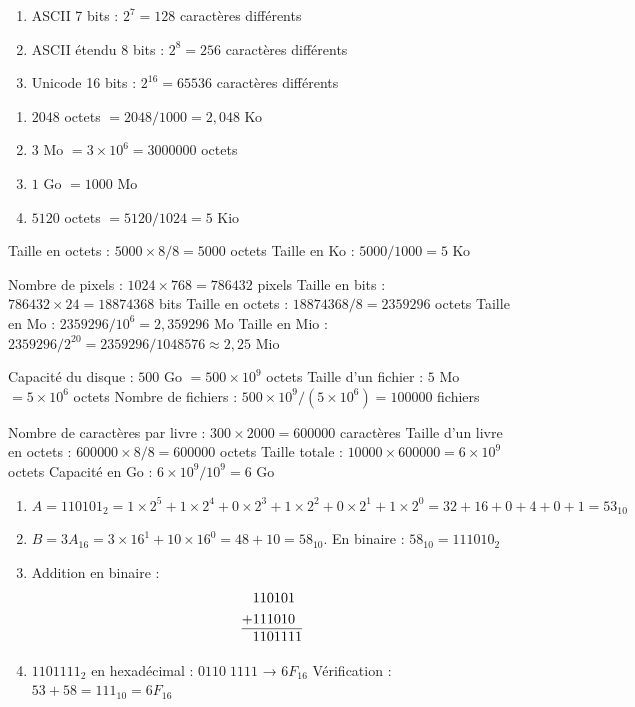 \begin{enumerate}
    \item ASCII 7 bits : $2^7 = 128$ caractères différents
    \item ASCII étendu 8 bits : $2^8 = 256$ caractères différents
    \item Unicode 16 bits : $2^{16} = 65536$ caractères différents
\end{enumerate}

\begin{enumerate}
    \item $2048$ octets $= 2048 / 1000 = 2,048$ Ko
    \item $3$ Mo $= 3 \times 10^6 = 3 000 000$ octets
    \item $1$ Go $= 1000$ Mo
    \item $5120$ octets $= 5120 / 1024 = 5$ Kio
\end{enumerate}

Taille en octets : $5000 \times 8 / 8 = 5000$ octets
Taille en Ko : $5000 / 1000 = 5$ Ko

Nombre de pixels : $1024 \times 768 = 786432$ pixels
Taille en bits : $786432 \times 24 = 18874368$ bits
Taille en octets : $18874368 / 8 = 2359296$ octets
Taille en Mo : $2359296 / 10^6 = 2,359296$ Mo
Taille en Mio : $2359296 / 2^{20} = 2359296 / 1048576 \approx 2,25$ Mio

Capacité du disque : $500$ Go $= 500 \times 10^9$ octets
Taille d'un fichier : $5$ Mo $= 5 \times 10^6$ octets
Nombre de fichiers : $500 \times 10^9 / (5 \times 10^6) = 100 000$ fichiers

Nombre de caractères par livre : $300 \times 2000 = 600 000$ caractères
Taille d'un livre en octets : $600 000 \times 8 / 8 = 600 000$ octets
Taille totale : $10 000 \times 600 000 = 6 \times 10^9$ octets
Capacité en Go : $6 \times 10^9 / 10^9 = 6$ Go

\begin{enumerate}
    \item $A = 110101_2 = 1\times2^5 + 1\times2^4 + 0\times2^3 + 1\times2^2 + 0\times2^1 + 1\times2^0 = 32 + 16 + 0 + 4 + 0 + 1 = 53_{10}$
    \item $B = 3A_{16} = 3\times16^1 + 10\times16^0 = 48 + 10 = 58_{10}$. En binaire : $58_{10} = 111010_2$
    \item Addition en binaire :
    \begin{align*}
        &110101\\
        +&111010\\
        \hline
        &1101111
    \end{align*}
    \item $1101111_2$ en hexadécimal : $0110\;1111$ → $6F_{16}$
    Vérification : $53 + 58 = 111_{10} = 6F_{16}$
\end{enumerate}

